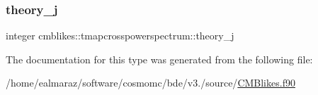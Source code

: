 \mbox{\label{structcmblikes_1_1tmapcrosspowerspectrum_a4a55d70d03e2c1261bbebd66cac1077f}} 
\subsubsection{\texorpdfstring{theory\+\_\+j}{theory\_j}}
{\footnotesize\ttfamily integer cmblikes\+::tmapcrosspowerspectrum\+::theory\+\_\+j\hspace{0.3cm}{\ttfamily [private]}}



The documentation for this type was generated from the following file\+:\begin{DoxyCompactItemize}
\item 
/home/ealmaraz/software/cosmomc/bde/v3./source/\mbox{\hyperlink{CMBlikes_8f90}{C\+M\+Blikes.\+f90}}\end{DoxyCompactItemize}
